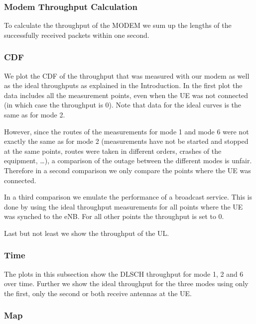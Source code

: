 \documentclass[a4paper,10pt]{article}
\newcommand{\printfile}[2][]{
 \begin{minipage}{8cm}
  \centering
  \texttt{[image: /extras/kaltenbe/CNES/emos\_postprocessed\_data/\#2]}
  \url{#2}: #1

 \end{minipage}
}
\begin{document}
\subsubsection{Modem Throughput Calculation}
To calculate the throughput of the MODEM we sum up the lengths of the successfully received packets within one second. 


\subsubsection{CDF}
\label{sec:cdf}


We plot the CDF of the throughput that was measured with our modem as well as the ideal throughputs as explained in the Introduction. In the first plot the data includes all the measurement points, even when the UE was not connected (in which case the throughput is 0). Note that data for the ideal curves is the same as for mode 2. 

However, since the routes of the measurements for mode 1 and mode 6 were not exactly the same as for mode 2 (measurements have not be started and stopped at the same points, routes were taken in different orders, crashes of the equipment, \ldots), a comparison of the outage between the different modes is unfair. Therefore in a second comparison we only compare the points where the UE was connected. 

In a third comparison we emulate the performance of a broadcast service. This is done by using the ideal throughput measurements for all points where the UE was synched to the eNB. For all other points the throughput is set to 0.

Last but not least we show the throughput of the UL.


\subsubsection{Time}

The plots in this subsection show the DLSCH throughput for mode 1, 2 and 6 over time. Further we show the ideal throughput for the three modes using only the first, only the second or both receive antennas at the UE.


\subsubsection{Map}
\end{document}

